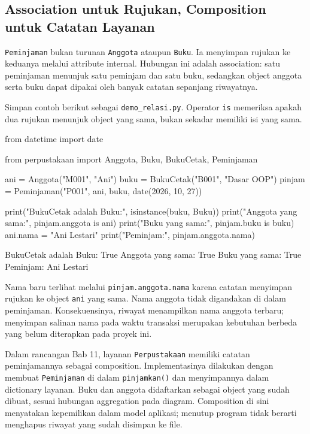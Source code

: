 \subsection{Association untuk Rujukan, Composition untuk Catatan Layanan}

\texttt{Peminjaman} bukan turunan \texttt{Anggota} ataupun \texttt{Buku}. Ia menyimpan rujukan ke keduanya melalui attribute internal. Hubungan ini adalah association: satu peminjaman menunjuk satu peminjam dan satu buku, sedangkan object anggota serta buku dapat dipakai oleh banyak catatan sepanjang riwayatnya.

Simpan contoh berikut sebagai \texttt{demo\_relasi.py}. Operator \texttt{is} memeriksa apakah dua rujukan menunjuk object yang sama, bukan sekadar memiliki isi yang sama.

\begin{kode}
from datetime import date

from perpustakaan import Anggota, Buku, BukuCetak, Peminjaman


ani = Anggota("M001", "Ani")
buku = BukuCetak("B001", "Dasar OOP")
pinjam = Peminjaman("P001", ani, buku, date(2026, 10, 27))

print("BukuCetak adalah Buku:", isinstance(buku, Buku))
print("Anggota yang sama:", pinjam.anggota is ani)
print("Buku yang sama:", pinjam.buku is buku)
ani.nama = "Ani Lestari"
print("Peminjam:", pinjam.anggota.nama)
\end{kode}

\begin{keluaran}
BukuCetak adalah Buku: True
Anggota yang sama: True
Buku yang sama: True
Peminjam: Ani Lestari
\end{keluaran}

Nama baru terlihat melalui \texttt{pinjam.anggota.nama} karena catatan menyimpan rujukan ke object \texttt{ani} yang sama. Nama anggota tidak digandakan di dalam peminjaman. Konsekuensinya, riwayat menampilkan nama anggota terbaru; menyimpan salinan nama pada waktu transaksi merupakan kebutuhan berbeda yang belum diterapkan pada proyek ini.

Dalam rancangan Bab 11, layanan \texttt{Perpustakaan} memiliki catatan peminjamannya sebagai composition. Implementasinya dilakukan dengan membuat \texttt{Peminjaman} di dalam \texttt{pinjamkan()} dan menyimpannya dalam dictionary layanan. Buku dan anggota didaftarkan sebagai object yang sudah dibuat, sesuai hubungan aggregation pada diagram. Composition di sini menyatakan kepemilikan dalam model aplikasi; menutup program tidak berarti menghapus riwayat yang sudah disimpan ke file.

